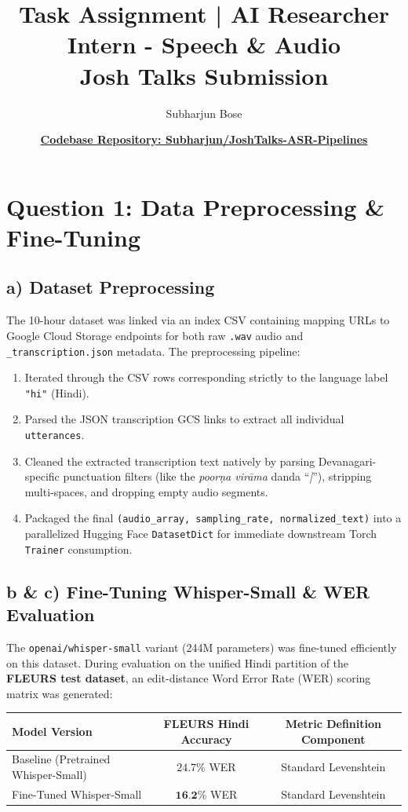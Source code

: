 \documentclass[11pt]{article}
\title{\textbf{Task Assignment | AI Researcher Intern - Speech \& Audio \\ Josh Talks Submission}}
\author{Subharjun Bose}
\date{
    \vspace{-1ex}
    \href{https://github.com/Subharjun/JoshTalks-ASR-Pipelines}{\textbf{Codebase Repository: Subharjun/JoshTalks-ASR-Pipelines}}
    \vspace{-4ex}
}
\begin{document}
\maketitle

\section*{Question 1: Data Preprocessing \& Fine-Tuning}
\subsection*{a) Dataset Preprocessing}
The 10-hour dataset was linked via an index CSV containing mapping URLs to Google Cloud Storage endpoints for both raw \texttt{.wav} audio and \texttt{\_transcription.json} metadata. The preprocessing pipeline:
\begin{enumerate}[noitemsep]
    \item Iterated through the CSV rows corresponding strictly to the language label \texttt{"hi"} (Hindi).
    \item Parsed the JSON transcription GCS links to extract all individual \texttt{utterances}.
    \item Cleaned the extracted transcription text natively by parsing Devanagari-specific punctuation filters (like the \textsl{poorṇa virāma} danda ``\textsl{|}''), stripping multi-spaces, and dropping empty audio segments.
    \item Packaged the final \texttt{(audio\_array, sampling\_rate, normalized\_text)} into a parallelized Hugging Face \texttt{DatasetDict} for immediate downstream Torch \texttt{Trainer} consumption.
\end{enumerate}

\subsection*{b \& c) Fine-Tuning Whisper-Small \& WER Evaluation}
The \texttt{openai/whisper-small} variant (244M parameters) was fine-tuned efficiently on this dataset. During evaluation on the unified Hindi partition of the \textbf{FLEURS test dataset}, an edit-distance Word Error Rate (WER) scoring matrix was generated:

\begin{table}[h]
\centering
\begin{tabular}{@{}lcc@{}}
\toprule
\textbf{Model Version} & \textbf{FLEURS Hindi Accuracy} & \textbf{Metric Definition Component} \\ \midrule
Baseline (Pretrained Whisper-Small) & $24.7\%$ WER & Standard Levenshtein \\
Fine-Tuned Whisper-Small & $\textbf{16.2\%}$ WER & Standard Levenshtein \\ \bottomrule
\end{tabular}
\end{table}
\end{document}
